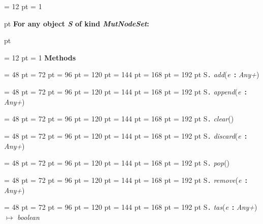 {{{{{\par}
\par}
{\par \pagebreak[3.200000] \noindent \hangindent = 12 pt \hangafter = 1 
{\par \pagebreak[2]  pt \noindent
{\large {\bf For any object {\em S\/} of kind  {\em MutNodeSet\/}:\/}}\par {} pt
} \noindent
\par}
{\par \pagebreak[3.200000] \noindent \hangindent = 12 pt \hangafter = 1 
{\bf {\large {\bf Methods\/}}\/}\par}
{\par \noindent  \leftskip = 48 pt  \leftmargini = 72 pt  \leftmarginii = 96 pt  \leftmarginiii = 120 pt  \leftmarginiv = 144 pt  \leftmarginv = 168 pt  \leftmarginvi = 192 pt S{\large {\tt .\/} {\em add\/}}({\em e\/}~{\bf :}  {\em Any+\/})\par}
{\par \noindent  \leftskip = 48 pt  \leftmargini = 72 pt  \leftmarginii = 96 pt  \leftmarginiii = 120 pt  \leftmarginiv = 144 pt  \leftmarginv = 168 pt  \leftmarginvi = 192 pt S{\large {\tt .\/} {\em append\/}}({\em e\/}~{\bf :}  {\em Any+\/})\par}
{\par \noindent  \leftskip = 48 pt  \leftmargini = 72 pt  \leftmarginii = 96 pt  \leftmarginiii = 120 pt  \leftmarginiv = 144 pt  \leftmarginv = 168 pt  \leftmarginvi = 192 pt S{\large {\tt .\/} {\em clear\/}}()\par}
{\par \noindent  \leftskip = 48 pt  \leftmargini = 72 pt  \leftmarginii = 96 pt  \leftmarginiii = 120 pt  \leftmarginiv = 144 pt  \leftmarginv = 168 pt  \leftmarginvi = 192 pt S{\large {\tt .\/} {\em discard\/}}({\em e\/}~{\bf :}  {\em Any+\/})\par}
{\par \noindent  \leftskip = 48 pt  \leftmargini = 72 pt  \leftmarginii = 96 pt  \leftmarginiii = 120 pt  \leftmarginiv = 144 pt  \leftmarginv = 168 pt  \leftmarginvi = 192 pt S{\large {\tt .\/} {\em pop\/}}()\par}
{\par \noindent  \leftskip = 48 pt  \leftmargini = 72 pt  \leftmarginii = 96 pt  \leftmarginiii = 120 pt  \leftmarginiv = 144 pt  \leftmarginv = 168 pt  \leftmarginvi = 192 pt S{\large {\tt .\/} {\em remove\/}}({\em e\/}~{\bf :}  {\em Any+\/})\par}
{\par \noindent  \leftskip = 48 pt  \leftmargini = 72 pt  \leftmarginii = 96 pt  \leftmarginiii = 120 pt  \leftmarginiv = 144 pt  \leftmarginv = 168 pt  \leftmarginvi = 192 pt S{\large {\tt .\/} {\em tas\/}}({\em e\/}~{\bf :}  {\em Any+\/}) \(\mapsto \)  {\em boolean\/}\par}
}}}
